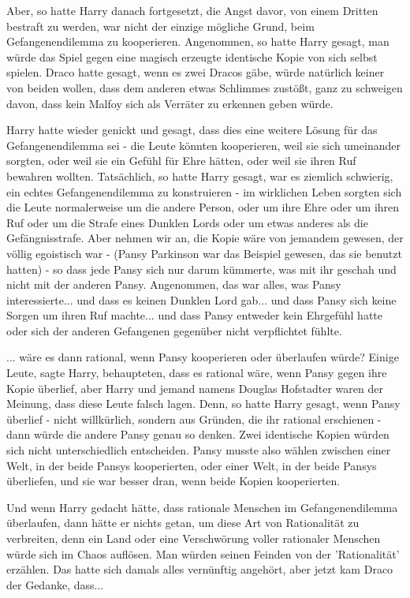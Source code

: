 Aber, so hatte Harry danach fortgesetzt, die Angst davor, von einem Dritten
bestraft zu werden, war nicht der einzige mögliche Grund, beim Gefangenendilemma
zu kooperieren. Angenommen, so hatte Harry gesagt, man würde das Spiel gegen
eine magisch erzeugte identische Kopie von sich selbst spielen. Draco hatte
gesagt, wenn es zwei Dracos gäbe, würde natürlich keiner von beiden wollen, dass
dem anderen etwas Schlimmes zustößt, ganz zu schweigen davon, dass kein Malfoy
sich als Verräter zu erkennen geben würde.

Harry hatte wieder genickt und gesagt, dass dies eine weitere Lösung für das
Gefangenendilemma sei - die Leute könnten kooperieren, weil sie sich umeinander
sorgten, oder weil sie ein Gefühl für Ehre hätten, oder weil sie ihren Ruf
bewahren wollten. Tatsächlich, so hatte Harry gesagt, war es ziemlich schwierig,
ein echtes Gefangenendilemma zu konstruieren - im wirklichen Leben sorgten sich
die Leute normalerweise um die andere Person, oder um ihre Ehre oder um ihren
Ruf oder um die Strafe eines Dunklen Lords oder um etwas anderes als die
Gefängnisstrafe. Aber nehmen wir an, die Kopie wäre von jemandem gewesen, der
völlig egoistisch war - (Pansy Parkinson war das Beispiel gewesen, das sie
benutzt hatten) - so dass jede Pansy sich nur darum kümmerte, was mit ihr
geschah und nicht mit der anderen Pansy. Angenommen, das war alles, was Pansy
interessierte... und dass es keinen Dunklen Lord gab... und dass Pansy sich
keine Sorgen um ihren Ruf machte... und dass Pansy entweder kein Ehrgefühl hatte
oder sich der anderen Gefangenen gegenüber nicht verpflichtet fühlte.

... wäre es dann rational, wenn Pansy kooperieren oder überlaufen würde? Einige
Leute, sagte Harry, behaupteten, dass es rational wäre, wenn Pansy gegen ihre
Kopie überlief, aber Harry und jemand namens Douglas Hofstadter waren der
Meinung, dass diese Leute falsch lagen. Denn, so hatte Harry gesagt, wenn Pansy
überlief - nicht willkürlich, sondern aus Gründen, die ihr rational erschienen -
dann würde die andere Pansy genau so denken. Zwei identische Kopien würden sich
nicht unterschiedlich entscheiden. Pansy musste also wählen zwischen einer Welt,
in der beide Pansys kooperierten, oder einer Welt, in der beide Pansys
überliefen, und sie war besser dran, wenn beide Kopien kooperierten.

Und wenn Harry gedacht hätte, dass \glqq rationale\grqq{} Menschen im
Gefangenendilemma überlaufen, dann hätte er nichts getan, um diese Art von \glqq
Rationalität\grqq{} zu verbreiten, denn ein Land oder eine Verschwörung voller
\glqq rationaler\grqq{} Menschen würde sich im Chaos auflösen. Man würden seinen
Feinden von der 'Rationalität' erzählen. Das hatte sich damals alles vernünftig
angehört, aber jetzt kam Draco der Gedanke, dass...

